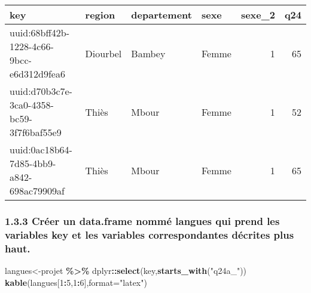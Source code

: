 \documentclass[
]{article}
\newenvironment{Shaded}{\begin{snugshade}}{\end{snugshade}}
\newcommand{\AttributeTok}[1]{\textcolor[rgb]{0.13,0.29,0.53}{#1}}
\newcommand{\CommentTok}[1]{\textcolor[rgb]{0.56,0.35,0.01}{\textit{#1}}}
\newcommand{\DecValTok}[1]{\textcolor[rgb]{0.00,0.00,0.81}{#1}}
\newcommand{\DocumentationTok}[1]{\textcolor[rgb]{0.56,0.35,0.01}{\textbf{\textit{#1}}}}
\newcommand{\FunctionTok}[1]{\textcolor[rgb]{0.13,0.29,0.53}{\textbf{#1}}}
\newcommand{\NormalTok}[1]{#1}
\newcommand{\OtherTok}[1]{\textcolor[rgb]{0.56,0.35,0.01}{#1}}
\newcommand{\SpecialCharTok}[1]{\textcolor[rgb]{0.81,0.36,0.00}{\textbf{#1}}}
\newcommand{\StringTok}[1]{\textcolor[rgb]{0.31,0.60,0.02}{#1}}
\begin{document}
\begin{Shaded}
\end{Shaded}

\begin{tabular}{l|l|l|l|r|r}
\hline
key & region & departement & sexe & sexe\_2 & q24\\
\hline
uuid:68bff42b-1228-4c66-9bcc-e6d312d9fea6 & Diourbel & Bambey & Femme & 1 & 65\\
\hline
uuid:d70b3c7e-3ca0-4358-bc59-3f7f6baf55e9 & Thiès & Mbour & Femme & 1 & 52\\
\hline
uuid:0ac18b64-7d85-4bb9-a842-698ac79909af & Thiès & Mbour & Femme & 1 & 65\\
\hline
\end{tabular}

\hypertarget{cruxe9er-un-data.frame-nommuxe9-langues-qui-prend-les-variables-key-et-les-variables-correspondantes-duxe9crites-plus-haut.}{%
\subsubsection{1.3.3 Créer un data.frame nommé langues qui prend les
variables key et les variables correspondantes décrites plus
haut.}\label{cruxe9er-un-data.frame-nommuxe9-langues-qui-prend-les-variables-key-et-les-variables-correspondantes-duxe9crites-plus-haut.}}

\begin{Shaded}
\begin{Highlighting}[]
\NormalTok{langues}\OtherTok{\textless{}{-}}\NormalTok{projet }\SpecialCharTok{\%\textgreater{}\%}\NormalTok{ dplyr}\SpecialCharTok{::}\FunctionTok{select}\NormalTok{(key,}\FunctionTok{starts\_with}\NormalTok{(}\StringTok{"q24a\_"}\NormalTok{))}
\FunctionTok{kable}\NormalTok{(langues[}\DecValTok{1}\SpecialCharTok{:}\DecValTok{5}\NormalTok{,}\DecValTok{1}\SpecialCharTok{:}\DecValTok{6}\NormalTok{],}\AttributeTok{format=}\StringTok{"latex"}\NormalTok{)}
\end{Highlighting}
\end{Shaded}
\end{document}
